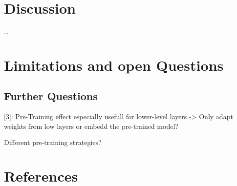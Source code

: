 \documentclass[
  11pt,
]{article}
\begin{document}
\hypertarget{discussion}{%
\section{Discussion}\label{discussion}}

\ldots{}

\hypertarget{limitations-and-open-questions}{%
\section{Limitations and open
Questions}\label{limitations-and-open-questions}}

\hypertarget{further-questions}{%
\subsection{Further Questions}\label{further-questions}}

{[}3{]}: Pre-Training effect especially usefull for lower-level layers
-\textgreater{} Only adapt weights from low layers or embedd the
pre-trained model?

Different pre-training strategies?

\newpage

\hypertarget{I}{%
\section*{References}\label{I}}
\end{document}
